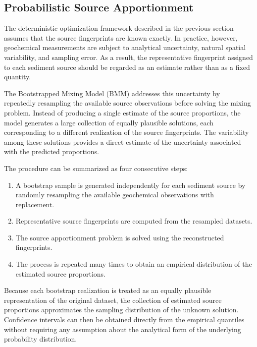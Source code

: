 \documentclass[
  12pt,
  letterpaper,
]{book}
\providecommand{\tightlist}{%
  \setlength{\itemsep}{0pt}\setlength{\parskip}{0pt}}
\begin{document}
\subsection{Probabilistic Source
Apportionment}\label{probabilistic-source-apportionment}

The deterministic optimization framework described in the previous
section assumes that the source fingerprints are known exactly. In
practice, however, geochemical measurements are subject to analytical
uncertainty, natural spatial variability, and sampling error. As a
result, the representative fingerprint assigned to each sediment source
should be regarded as an estimate rather than as a fixed quantity.

The Bootstrapped Mixing Model (BMM) addresses this uncertainty by
repeatedly resampling the available source observations before solving
the mixing problem. Instead of producing a single estimate of the source
proportions, the model generates a large collection of equally plausible
solutions, each corresponding to a different realization of the source
fingerprints. The variability among these solutions provides a direct
estimate of the uncertainty associated with the predicted proportions.

The procedure can be summarized as four consecutive steps:

\begin{enumerate}
\def\labelenumi{\arabic{enumi}.}
\tightlist
\item
  A bootstrap sample is generated independently for each sediment source
  by randomly resampling the available geochemical observations with
  replacement.
\item
  Representative source fingerprints are computed from the resampled
  datasets.
\item
  The source apportionment problem is solved using the reconstructed
  fingerprints.
\item
  The process is repeated many times to obtain an empirical distribution
  of the estimated source proportions.
\end{enumerate}

Because each bootstrap realization is treated as an equally plausible
representation of the original dataset, the collection of estimated
source proportions approximates the sampling distribution of the unknown
solution. Confidence intervals can then be obtained directly from the
empirical quantiles without requiring any assumption about the
analytical form of the underlying probability distribution.
\end{document}
